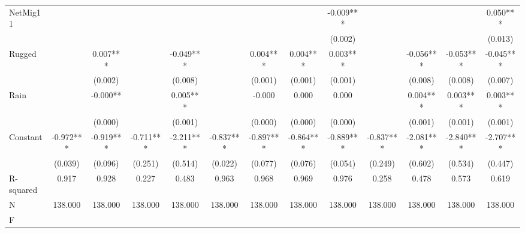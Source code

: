 {\begin{tabular}{l*{12}{c}}
NetMig11            &               &               &               &               &               &               &               &      -0.009***&               &               &               &       0.050***\\
                    &               &               &               &               &               &               &               &     (0.002)   &               &               &               &     (0.013)   \\
Rugged              &               &       0.007***&               &      -0.049***&               &       0.004***&       0.004***&       0.003***&               &      -0.056***&      -0.053***&      -0.045***\\
                    &               &     (0.002)   &               &     (0.008)   &               &     (0.001)   &     (0.001)   &     (0.001)   &               &     (0.008)   &     (0.008)   &     (0.007)   \\
Rain                &               &      -0.000** &               &       0.005***&               &      -0.000   &       0.000   &       0.000   &               &       0.004***&       0.003***&       0.003***\\
                    &               &     (0.000)   &               &     (0.001)   &               &     (0.000)   &     (0.000)   &     (0.000)   &               &     (0.001)   &     (0.001)   &     (0.001)   \\
Constant            &      -0.972***&      -0.919***&      -0.711***&      -2.211***&      -0.837***&      -0.897***&      -0.864***&      -0.889***&      -0.837***&      -2.081***&      -2.840***&      -2.707***\\
                    &     (0.039)   &     (0.096)   &     (0.251)   &     (0.514)   &     (0.022)   &     (0.077)   &     (0.076)   &     (0.054)   &     (0.249)   &     (0.602)   &     (0.534)   &     (0.447)   \\
\hline
R-squared           &       0.917   &       0.928   &       0.227   &       0.483   &       0.963   &       0.968   &       0.969   &       0.976   &       0.258   &       0.478   &       0.573   &       0.619   \\
N                   &     138.000   &     138.000   &     138.000   &     138.000   &     138.000   &     138.000   &     138.000   &     138.000   &     138.000   &     138.000   &     138.000   &     138.000   \\
F                   &               &               &               &               &               &               &               &               &               &               &               &               \\
\hline\hline
\end{tabular}
}
